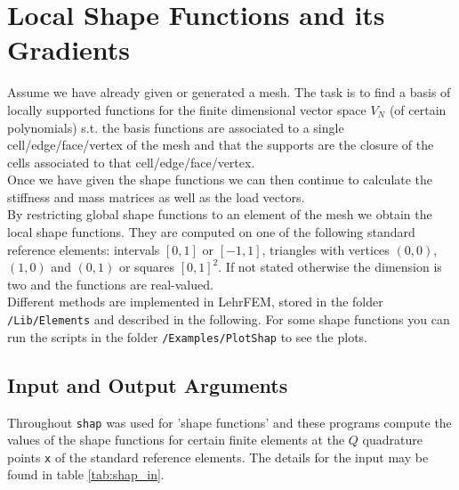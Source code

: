 
\chapter{Local Shape Functions and its Gradients} \label{chap:shap_fct}   

 Assume we have already given or generated a mesh. The task is to find a basis of locally supported functions for the finite dimensional vector space $V_N$ (of certain polynomials) s.t. the basis functions are associated to a single cell/edge/face/vertex of the mesh and that the supports are the closure of the cells associated to that cell/edge/face/vertex. \\

 Once we have given the shape functions we can then continue to calculate the stiffness and mass matrices as well as the load vectors. \\

 By restricting global shape functions to an element of the mesh we obtain the local shape functions. They are computed on one of the following standard reference elements: intervals $[0,1]$ or $[-1,1]$, triangles with vertices $(0,0)$, $(1,0)$ and $(0,1)$ or squares $[0,1]^2$. If not stated otherwise the dimension is two and the functions are real-valued. \\

 Different methods are implemented in LehrFEM, stored in the folder \linebreak
 {\tt /Lib/Elements} and described in the following. For some shape functions you can run the scripts in the folder {\tt /Examples/PlotShap} to see the plots. %



\section{Input and Output Arguments}

 Throughout {\tt shap} was used for 'shape functions' and these programs compute the values of the shape functions for certain finite elements at the $Q$ quadrature points {\tt x} of the standard reference elements. The details for the input may be found in table \ref{tab:shap_in}.

